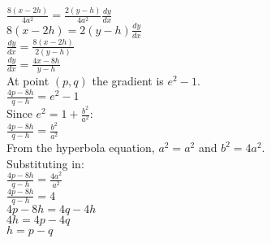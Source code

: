 \documentclass[../main.tex]{subfiles}
\begin{document}
\begin{enumerate}
    \(\frac{8(x-2h)}{4a^2}=\frac{2(y-h)}{4a^2}\frac{dy}{dx}\)\\

    \(8(x-2h)=2(y-h)\frac{dy}{dx}\)\\

    \(\frac{dy}{dx}=\frac{8(x-2h)}{2(y-h)}\)\\

    \(\frac{dy}{dx}=\frac{4x-8h}{y-h}\)\\

    At point \((p,q)\) the gradient is \(e^2 -1\).\\
    \(\frac{4p-8h}{q-h}=e^2-1\)\\

    Since \(e^2=1+\frac{b^2}{a^2}\):\\
    \(\frac{4p-8h}{q-h}=\frac{b^2}{a^2}\)\\
    
    From the hyperbola equation, \(a^2=a^2\) and \(b^2=4a^2\).\\
    Substituting in:\\
    \(\frac{4p-8h}{q-h}=\frac{4a^2}{a^2}\)\\

    \(\frac{4p-8h}{q-h}=4\)\\

    \(4p-8h=4q-4h\)\\
    \(4h=4p-4q\)\\
    \(h=p-q\)\\
    
\end{enumerate}
\end{document}
